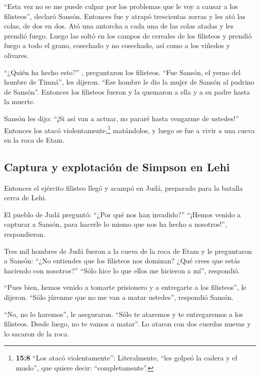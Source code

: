  ``Esta vez no se me puede culpar por los problemas que le
voy a causar a los filisteos'', declaró Sansón.  Entonces
fue y atrapó trescientas zorras y les ató las colas, de dos en dos.
 Ató una antorcha a cada una de las colas atadas y les
prendió fuego. Luego las soltó en los campos de cereales de los
filisteos y prendió fuego a todo el grano, cosechado y no cosechado, así
como a los viñedos y olivares.

 ``¿Quién ha hecho esto?'' , preguntaron los filisteos.
``Fue Sansón, el yerno del hombre de Timná'', les dijeron. ``Ese hombre
le dio la mujer de Sansón al padrino de Sansón''. Entonces los filisteos
fueron y la quemaron a ella y a su padre hasta la muerte.

 Sansón les dijo: ``¡Si así van a actuar, no pararé hasta
vengarme de ustedes!''  Entonces los atacó
violentamente,\footnote{\textbf{15:8} ``Los atacó violentamente'':
  Literalmente, ``les golpeó la cadera y el muslo'', que quiere decir:
  ``completamente''.} matándolos, y luego se fue a vivir a una cueva en
la roca de Etam.

\hypertarget{captura-y-explotaciuxf3n-de-simpson-en-lehi}{%
\subsection{Captura y explotación de Simpson en
Lehi}\label{captura-y-explotaciuxf3n-de-simpson-en-lehi}}

 Entonces el ejército filisteo llegó y acampó en Judá,
preparado para la batalla cerca de Lehi.

 El pueblo de Judá preguntó: ``¿Por qué nos han
invadido?'' ``¡Hemos venido a capturar a Sansón, para hacerle lo mismo
que nos ha hecho a nosotros!'', respondieron.

 Tres mil hombres de Judá fueron a la cueva de la roca de
Etam y le preguntaron a Sansón: ``¿No entiendes que los filisteos nos
dominan? ¿Qué crees que estás haciendo con nosotros?'' ``Sólo hice lo
que ellos me hicieron a mí'', respondió.

 ``Pues bien, hemos venido a tomarte prisionero y a
entregarte a los filisteos'', le dijeron. ``Sólo júrenme que no me van a
matar ustedes'', respondió Sansón.

 ``No, no lo haremos'', le aseguraron. ``Sólo te ataremos
y te entregaremos a los filisteos. Desde luego, no te vamos a matar''.
Lo ataron con dos cuerdas nuevas y lo sacaron de la roca.

